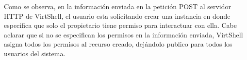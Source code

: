Como se observa, en la información enviada en la petición POST al servidor HTTP de VirtShell, el usuario esta solicitando crear una instancia en donde especifica que solo el propietario tiene permiso para interactuar con ella. Cabe aclarar que si no se especifican los permisos en la información enviada, VirtShell asigna todos los permisos al recurso creado, dejándolo publico para todos los usuarios del sistema.
